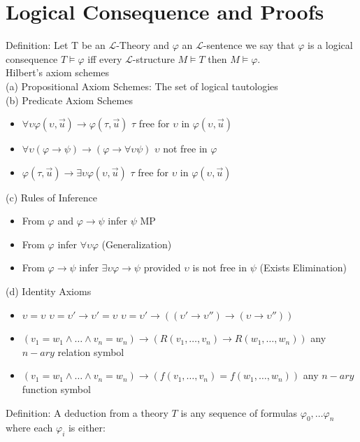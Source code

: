 \documentclass[10pt]{article}
\begin{document}
\section*{Logical Consequence and Proofs}
Definition: Let T be an $\mathcal{L}$-Theory and $\varphi$ an $\mathcal{L}$-sentence we say that $\varphi$ is a logical consequence $T\models\varphi$ iff every $\mathcal{L}$-structure $M\models T$ then $M\models \varphi$.\\
Hilbert's axiom schemes\\
(a) Propositional Axiom Schemes: The set of logical tautologies\\
(b) Predicate Axiom Schemes\begin{itemize}
    \item $\forall\upsilon\varphi(\upsilon,\vec{u})\rightarrow \varphi(\tau,\vec{u})$ $\tau$ free for $\upsilon$ in $\varphi(\upsilon,\vec{u})$
    \item $\forall\upsilon(\varphi\rightarrow\psi)\rightarrow(\varphi\rightarrow\forall\upsilon\psi)$ $\upsilon$ not free in $\varphi$
    \item $\varphi(\tau,\vec{u})\rightarrow\exists\upsilon\varphi(\upsilon,\vec{u})$ $\tau$ free for $\upsilon$ in $\varphi(\upsilon,\vec{u})$
\end{itemize}
(c) Rules of Inference \begin{itemize}
    \item From $\varphi$ and $\varphi\rightarrow\psi$ infer $\psi$ MP
    \item From $\varphi$ infer $\forall\upsilon\varphi$ (Generalization)
    \item From $\varphi\rightarrow\psi$ infer $\exists\upsilon\varphi\rightarrow\psi$ provided $\upsilon$ is not free in $\psi$ (Exists Elimination)
\end{itemize}
(d) Identity Axioms \begin{itemize}
    \item $\upsilon=\upsilon$ $\upsilon=\upsilon'\rightarrow\upsilon'=\upsilon$ $\upsilon=\upsilon'\rightarrow((\upsilon'\rightarrow\upsilon'')\rightarrow(\upsilon\rightarrow\upsilon''))$
    \item $(v_1=w_1\land\ldots\land v_n=w_n)\rightarrow(R(v_1,\ldots,v_n)\rightarrow R(w_1,\ldots,w_n))$ any $n-ary$ relation symbol
    \item $(v_1=w_1\land\ldots\land v_n=w_n)\rightarrow(f(v_1,\ldots,v_n)=f(w_1,\ldots,w_n))$ any $n-ary$ function symbol
\end{itemize}
Definition: A deduction from a theory $T$ is any sequence of formulas $\varphi_0,\ldots\varphi_n$ where each $\varphi_i$ is either:
\end{document}
